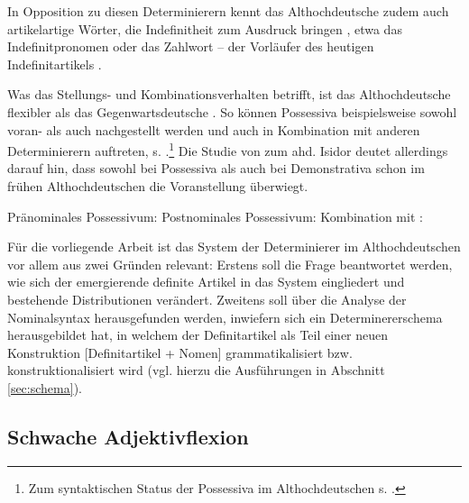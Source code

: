 In Opposition zu diesen  Determinierern kennt das Althochdeutsche zudem auch artikelartige Wörter, die Indefinitheit zum Ausdruck bringen \parencite[vgl. z.B.][253f.]{Braune2004}, etwa das Indefinitpronomen  \parencite{Donhauser2012} oder das Zahlwort  -- der Vorläufer des heutigen Indefinitartikels \parencite{Oubouzar2000,Szczepaniak2016a}. 

Was das Stellungs- und Kombinationsverhalten betrifft, ist das Althochdeutsche  flexibler als das Gegenwartsdeutsche \parencite[vgl.][104]{Szczepaniak2011a}. So können Possessiva beispielsweise sowohl voran- als auch nachgestellt werden und auch in Kombination mit anderen Determinierern auftreten, s.  \parencite[Beispiele aus][27f.]{Schrodt2004}.\footnote{Zum syntaktischen Status der Possessiva im Althochdeutschen s. \textcite[132ff.]{Demske2001}.} Die Studie von \textcite{Flick2018} zum ahd. Isidor deutet allerdings darauf hin, dass sowohl bei Possessiva als auch bei Demonstrativa schon im frühen Althochdeutschen die Voranstellung überwiegt.

\begin{exe}
	\ex \label{ex:poss-stellung}   
	\begin{xlist}
		\ex \label{ex:possvor} Pränominales Possessivum:  
		\ex \label{ex:possnach} Postnominales Possessivum:   
		\ex \label{ex:posskombi} Kombination mit :  
		\end{xlist}
\end{exe}


Für die vorliegende Arbeit ist das System der Determinierer im Althochdeutschen  vor allem aus zwei Gründen relevant: Erstens soll die Frage beantwortet werden, wie sich der emergierende definite Artikel in das System eingliedert und bestehende Distributionen verändert. Zweitens soll über die Analyse der Nominalsyntax herausgefunden werden, inwiefern sich ein Determinererschema herausgebildet hat, in welchem der Definitartikel als Teil einer neuen Konstruktion [Definitartikel + Nomen] grammatikalisiert bzw. konstruktionalisiert wird (vgl. hierzu die Ausführungen in Abschnitt \ref{sec:schema}). 

\subsection{Schwache Adjektivflexion} \label{schwache-Adjektivflexion}


